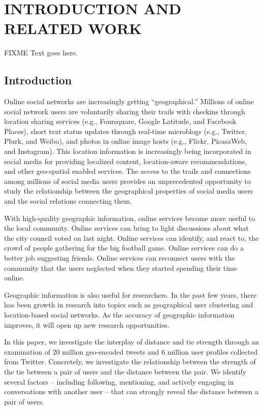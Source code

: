\pagestyle{plain} %
\setcounter{page}{1}


\chapter{\uppercase {Introduction and Related Work}}

FIXME Text goes here.

\section{Introduction}

Online social networks are increasingly getting ``geographical.'' Millions of
online social network users are voluntarily sharing their trails with checkins
through location sharing services (e.g., Foursquare, Google Latitude, and
Facebook Places), short text status updates through real-time microblogs (e.g.,
Twitter, Plurk, and Weibo), and photos in online image hosts (e.g., Flickr,
PicasaWeb, and Instagram). This location information is increasingly being
incorporated in social media for providing localized content, location-aware
recommendations, and other geo-spatial enabled services. The access to the
trails and connections among millions of social media users provides an
unprecedented opportunity to study the relationship between the geographical
properties of social media users and the social relations connecting them.

With high-quality geographic information, online services become more useful to
the local community.  Online services can bring to light discussions about what
the city council voted on last night.  Online services can identify, and react
to, the crowd of people gathering for the big football game.  Online services
can do a better job suggesting friends.  Online services can reconnect users
with the community that the users neglected when they started spending their
time online.

Geographic information is also useful for researchers.  In the past few years,
there has been growth in research into topics such as geographical user
clustering and location-based social networks.  As the accuracy of geographic
information improves, it will open up new research opportunities.

In this paper, we investigate the interplay of distance and tie strength
through an examination of 20 million geo-encoded tweets and 6 million user
profiles collected from Twitter. Concretely, we investigate the relationship
between the strength of the tie between a pair of users and the distance
between the pair.  We identify several factors -- including following,
mentioning, and actively engaging in conversations with another user -- that
can strongly reveal the distance between a pair of users.

